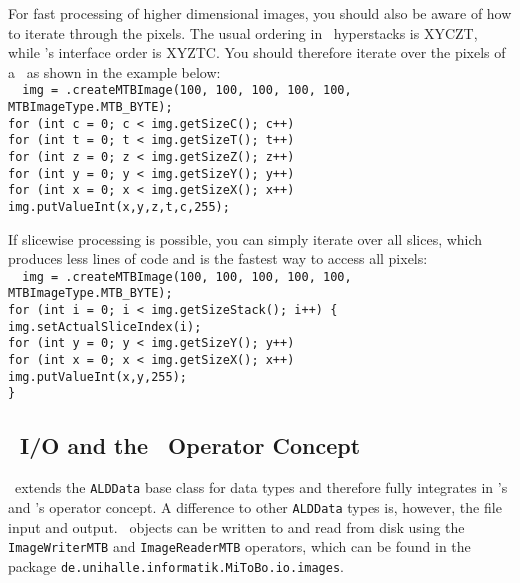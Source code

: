 For fast processing of higher dimensional images, you should also be aware of
how to iterate through the pixels. The usual ordering in \imgplus~hyperstacks 
is XYCZT, while \mitobo's interface
order is XYZTC. You should therefore iterate over the pixels of a \mtbimg~as
shown in the example below:\\[0.5cm]
\texttt{
\noindent\mtbimg~img = \mtbimg.createMTBImage(100, 100, 100, 100, 100,\\[-0.1cm]
						\hspace*{8.3cm}MTBImageType.MTB\_BYTE);\\[0.3cm]
for (int c = 0; c < img.getSizeC(); c++)\\[-0.1cm]
\hspace*{0.5cm}for (int t = 0; t < img.getSizeT(); t++)\\[-0.1cm] 
\hspace*{1.0cm}for (int z = 0; z < img.getSizeZ(); z++) \\[-0.1cm]
\hspace*{1.5cm}for (int y = 0; y < img.getSizeY(); y++) \\[-0.1cm]
\hspace*{2.0cm}for (int x = 0; x < img.getSizeX(); x++) \\[-0.1cm]
\hspace*{2.5cm}img.putValueInt(x,y,z,t,c,255);
}

If slicewise processing is possible, you can simply iterate over all slices,
which produces less lines of code and is the fastest way to access all
pixels:\\[0.3cm]
\texttt{
\noindent\mtbimg~img = \mtbimg.createMTBImage(100, 100, 100, 100, 100,\\[-0.1cm]
						\hspace*{8.3cm}MTBImageType.MTB\_BYTE);\\[0.3cm]
for (int i = 0; i < img.getSizeStack(); i++) \{ \\[-0.1cm]
\hspace*{0.5cm}img.setActualSliceIndex(i);\\[0.3cm]
\hspace*{0.5cm}for (int y = 0; y < img.getSizeY(); y++) \\[-0.1cm]
\hspace*{1.0cm}for (int x = 0; x < img.getSizeX(); x++) \\[-0.1cm]
\hspace*{1.5cm}img.putValueInt(x,y,255); \\[-0.1cm]
\}
}

\subsection{\mtbimg~I/O and the \mitobo~Operator Concept}
\mtbimg~extends the {\tt ALDData} base class for data types and therefore fully integrates in
\alida's and \mitobo's operator concept. 
A difference to other {\tt ALDData} types is, however, the
file input and output. \mtbimg~objects can be written to and read from disk
using the {\tt ImageWriterMTB} and {\tt ImageReaderMTB} operators, which can be
found in the package {\tt de.unihalle.informatik.MiToBo.io.images}.

